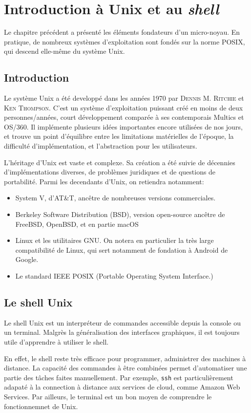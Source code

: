 \documentclass[french, toc]{../cs-classes/cs-classes}
\begin{document}
\section{Introduction à Unix et au \emph{shell}}
Le chapitre précédent a présenté les éléments fondateurs d'un micro-noyau. En pratique, de nombreux systèmes d'exploitation sont fondés sur la norme POSIX, qui descend elle-même du système Unix.

\subsection{Introduction}
Le système Unix a été developpé dans les années 1970 par \textsc{Dennis M. Ritchie} et \textsc{Ken Thompson}. C'est un système d'exploitation puissant créé en moins de deux personnes/années, court développement comparée à ses contemporais Multics et OS/360. Il implémente plusieurs idées importantes encore utilisées de nos jours, et trouve un point d'équilibre entre les limitations matérielles de l'époque, la difficulté d'implémentation, et l'abstraction pour les utilisateurs.

L'héritage d'Unix est vaste et complexe. Sa création a été suivie de décennies d'implémentations diverses, de problèmes juridiques et de questions de portabilité. Parmi les decendants d'Unix, on retiendra notamment:
\begin{itemize}
    \item System V, d'AT\&T, ancêtre de nombreuses versions commerciales.
    \item Berkeley Software Distribution (BSD), version open-source ancêtre de FreeBSD, OpenBSD, et en partie macOS
    \item Linux et les utilitaires GNU. On notera en particulier la très large compatibilité de Linux, qui sert notamment de fondation à Android de Google.
    \item Le standard IEEE POSIX (Portable Operating System Interface.)
\end{itemize}

\subsection{Le shell Unix}
Le shell Unix est un interpréteur de commandes accessible depuis la console ou un terminal. Malgrès la généralisation des interfaces graphiques, il est toujours utile d'apprendre à utiliser le shell. 

En effet, le shell reste très efficace pour programmer, administrer des machines à distance. La capacité des commandes à être combinées permet d'automatiser une partie des tâches faites manuellement. Par exemple, \texttt{ssh} est particulièrement adapaté à la connection à distance aux services de cloud, comme Amazon Web Services. Par ailleurs, le terminal est un bon moyen de comprendre le fonctionnemnet de Unix.
\end{document}
